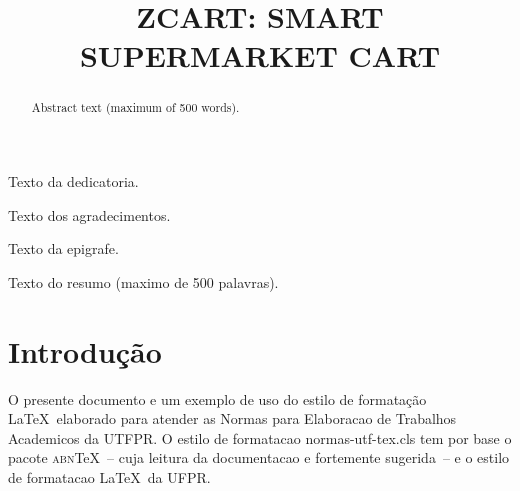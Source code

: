 \documentclass[openright]{normas-utf-tex} %
\title{\MakeUppercase{zCart: Smart Supermarket Cart}} %
\begin{document}
\capa %
\folhaderosto %

\begin{dedicatoria}
Texto da dedicatoria.
\end{dedicatoria}

\begin{agradecimentos}
Texto dos agradecimentos.
\end{agradecimentos}

\begin{epigrafe}
Texto da epigrafe.
\end{epigrafe}

\begin{resumo}
Texto do resumo (maximo de 500 palavras).
\end{resumo}

\begin{abstract}
Abstract text (maximum of 500 words).
\end{abstract}

\listadefiguras %
\listadetabelas %
\listadequadros %
\listadesiglas %
\listadesimbolos %

\sumario %


%
%
%
%

\setcounter{page}{12}

\chapter{Introdução}

O presente documento e um exemplo de uso do estilo de formatação \LaTeX\
elaborado para atender as Normas para Elaboracao de Trabalhos Academicos da
UTFPR. O estilo de formatacao {\ttfamily normas-utf-tex.cls} tem por base o
pacote \textsc{abn}\TeX~-- cuja leitura da documentacao \cite{abnTeX2009} e
fortemente sugerida~-- e o estilo de formatacao \LaTeX\ da UFPR.
\end{document}
